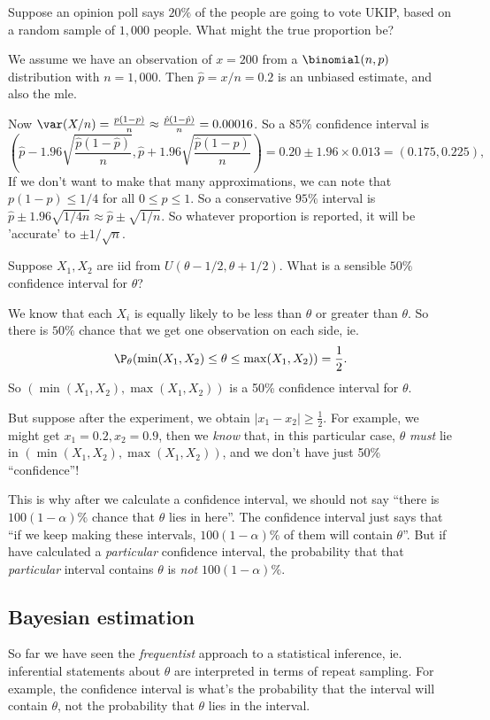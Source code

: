 \documentclass[a4paper]{article}
\begin{document}
\begin{eg}
  Suppose an opinion poll says $20\%$ of the people are going to vote UKIP, based on a random sample of $1,000$ people. What might the true proportion be?

  We assume we have an observation of $x = 200$ from a $\binomial(n, p)$ distribution with $n = 1,000$. Then $\hat p = x/n = 0.2$ is an unbiased estimate, and also the mle.

  Now $\var(X/n) = \frac{p(1 - p)}{n}\approx \frac{\hat p(1 - \hat p)}{n} = 0.00016$. So a $85\%$ confidence interval is
  \[
    \left(\hat p - 1.96\sqrt{\frac{\hat p(1 - \hat p)}{n}}, \hat p + 1.96\sqrt{\frac{\hat p(1 - \hat p)}{n}}\right) = 0.20 \pm 1.96\times 0.013 = (0.175, 0.225),
  \]
  If we don't want to make that many approximations, we can note that $p(1 - p)\leq 1/4$ for all $0 \leq p \leq 1$. So a conservative $95\%$ interval is $\hat p \pm 1.96\sqrt{1/4n} \approx \hat p \pm \sqrt{1/n}$. So whatever proportion is reported, it will be 'accurate' to $\pm 1/\sqrt{n}$.
\end{eg}

\begin{eg}
  Suppose $X_1, X_2$ are iid from $U(\theta - 1/2, \theta + 1/2)$. What is a sensible $50\%$ confidence interval for $\theta$?

  We know that each $X_i$ is equally likely to be less than $\theta$ or greater than $\theta$. So there is $50\%$ chance that we get one observation on each side, ie.
  \[
    \P_\theta(\min(X_1, X_2) \leq \theta \leq \max(X_1, X_2)) = \frac{1}{2}.
  \]
  So $(\min(X_1, X_2), \max (X_1, X_2))$ is a 50\% confidence interval for $\theta$.

  But suppose after the experiment, we obtain $|x_1 - x_2| \geq \frac{1}{2}$. For example, we might get $x_1 = 0.2, x_2 = 0.9$, then we \emph{know} that, in this particular case, $\theta$ \emph{must} lie in $(\min (X_1, X_2), \max(X_1, X_2))$, and we don't have just 50\% ``confidence''!

  This is why after we calculate a confidence interval, we should not say ``there is $100(1 - \alpha)\%$ chance that $\theta$ lies in here''. The confidence interval just says that ``if we keep making these intervals, $100(1 - \alpha)\%$ of them will contain $\theta$''. But if have calculated a \emph{particular} confidence interval, the probability that that \emph{particular} interval contains $\theta$ is \emph{not} $100(1 - \alpha)\%$.
\end{eg}

\subsection{Bayesian estimation}
So far we have seen the \emph{frequentist} approach to a statistical inference, ie. inferential statements about $\theta$ are interpreted in terms of repeat sampling. For example, the confidence interval is what's the probability that the interval will contain $\theta$, not the probability that $\theta$ lies in the interval.
\end{document}
